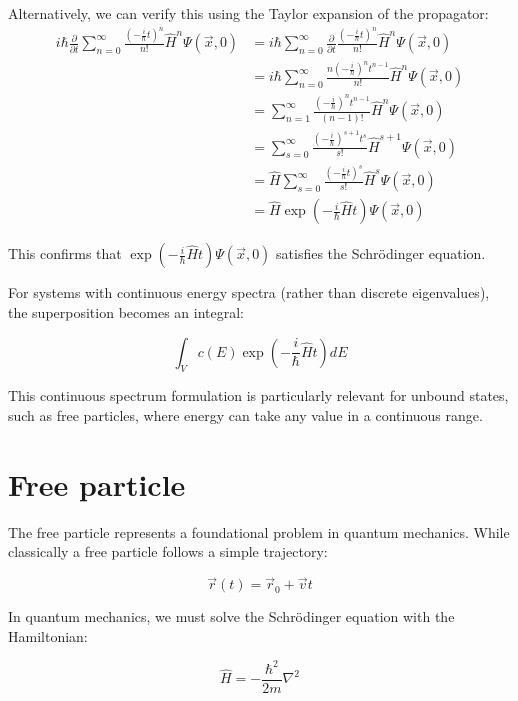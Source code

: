 Alternatively, we can verify this using the Taylor expansion of the propagator:
\begin{align}
i\hbar\frac{\partial}{\partial t}\sum_{n=0}^{\infty}\frac{\left(-\frac{i}{\hbar}t\right)^n}{n!}\hat{H}^n\Psi(\vec{x},0) &= i\hbar\sum_{n=0}^{\infty}\frac{\partial}{\partial t}\frac{\left(-\frac{i}{\hbar}t\right)^n}{n!}\hat{H}^n\Psi(\vec{x},0) \\
&= i\hbar\sum_{n=0}^{\infty}\frac{n\left(-\frac{i}{\hbar}\right)^nt^{n-1}}{n!}\hat{H}^n\Psi(\vec{x},0) \\
&= \sum_{n=1}^{\infty}\frac{\left(-\frac{i}{\hbar}\right)^nt^{n-1}}{(n-1)!}\hat{H}^n\Psi(\vec{x},0)  \\
&= \sum_{s=0}^{\infty}\frac{\left(-\frac{i}{\hbar}\right)^{s+1}t^s}{s!}\hat{H}^{s+1}\Psi(\vec{x},0) \\
&= \hat{H}\sum_{s=0}^{\infty}\frac{\left(-\frac{i}{\hbar}t\right)^s}{s!}\hat{H}^s\Psi(\vec{x},0) \\
&= \hat{H}\exp\left(-\frac{i}{\hbar}\hat{H}t\right)\Psi(\vec{x},0)
\end{align}

This confirms that $\exp\left(-\frac{i}{\hbar}\hat{H}t\right)\Psi(\vec{x},0)$ satisfies the Schrödinger equation.

For systems with continuous energy spectra (rather than discrete eigenvalues), the superposition becomes an integral:

\begin{equation}
\int_V c(E)\exp\left(-\frac{i}{\hbar}\hat{H}t\right)dE
\end{equation}

This continuous spectrum formulation is particularly relevant for unbound states, such as free particles, where energy can take any value in a continuous range.
\section{Free particle}

The free particle represents a foundational problem in quantum mechanics. While classically a free particle follows a simple trajectory:

\begin{equation}
\vec{r}(t) = \vec{r}_0 + \vec{v}t
\end{equation}

In quantum mechanics, we must solve the Schrödinger equation with the Hamiltonian:

\begin{equation}
\hat{H} = -\frac{\hbar^2}{2m}\nabla^2
\end{equation}

